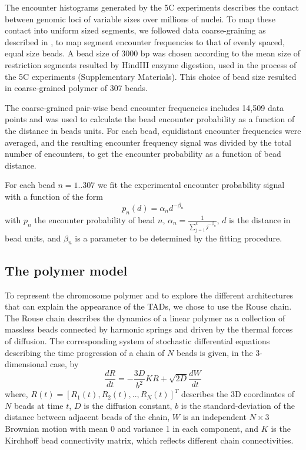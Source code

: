 \documentclass[12pt]{article}
\begin{document}
The encounter histograms generated by the 5C experiments describes the contact between genomic loci of variable sizes over millions of nuclei. To map these contact into uniform sized segments, we followed data coarse-graining as described in \cite{Giorgetti2014}, to map segment encounter frequencies to that of evenly spaced, equal size beads. A bead size of 3000 bp was chosen according to the mean size of restriction segments resulted by HindIII enzyme digestion, used in the process of the 5C experiments \cite{Nora2012} \cite{Giorgetti2014} (Supplementary Materials). This choice of bead size resulted in coarse-grained polymer of 307 beads.

The coarse-grained pair-wise bead encounter frequencies includes 14,509 data points and was used to calculate the bead encounter probability as a function of the distance in beads units. For each bead, equidistant encounter frequencies were averaged, and the resulting encounter frequency signal was divided by the total number of encounters, to get the encounter probability as a function of bead distance.

For each bead $n=1..307$ we fit the experimental encounter probability signal with a function of the form 
\begin{equation}\label{equation_encounterProbabilityModel}
p_n(d)=\alpha_n d^{-\beta_n}
\end{equation}
with $p_n$ the encounter probability of bead $n$, $\alpha_n = \frac{1}{\sum_{j=1}^k j^{-\beta_n}}$, $d$ is the distance in bead units, and $\beta_n$ is a parameter to be determined by the fitting procedure.


\subsection{The polymer model}\label{subsection_thePolymerModel}
To represent the chromosome polymer and to explore the different architectures that can explain the appearance of the TADs, we chose to use the Rouse chain. The Rouse chain describes the dynamics of a linear polymer as a collection of massless beads connected by harmonic springs and driven by the thermal forces of diffusion. The corresponding system of stochastic differential equations describing the time progression of a chain of $N$ beads is given, in the 3-dimensional case, by
\begin{equation}
\frac{dR}{dt}=-\frac{3D}{b^2}KR +\sqrt{2D}\frac{dW}{dt}
\end{equation}
where, $R(t)=[R_1(t),R_2(t),..,R_N(t)]^T$ describes the 3D coordinates of $N$ beads at time $t$, $D$ is the diffusion constant, $b$ is the standard-deviation of the distance between adjacent beads of the chain, $W$ is an independent $N\times3$ Brownian motion with mean 0 and variance 1 in each component, and $K$ is the Kirchhoff bead connectivity matrix, which reflects different chain connectivities.
\end{document}
